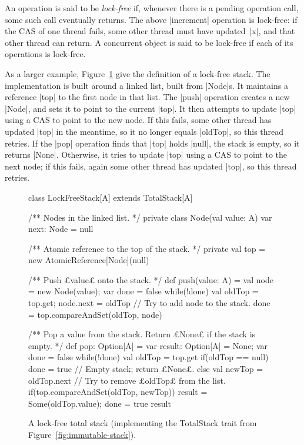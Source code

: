 An operation is said to be \emph{lock-free} if, whenever
there is a pending operation call, some such call eventually returns.  The
above |increment| operation is lock-free: if the CAS of one thread fails, some
other thread must have updated~|x|, and that other thread can return.  A
concurrent object is said to be lock-free if each of its operations is
lock-free.



As a larger example, Figure~\ref{fig:lock-free-stack} give the definition of a
lock-free stack.  The implementation is built around a linked list, built from
|Node|s.  It maintains a reference |top| to the first node in that list.  The
|push| operation creates a new |Node|, and sets it to point to the current
|top|.  It then attempts to update |top| using a CAS to point to the new node.
If this fails, some other thread has updated |top| in the meantime, so it no
longer equals |oldTop|, so this thread retries.  If the |pop| operation finds
that |top| holds |null|, the stack is empty, so it returns |None|.  Otherwise,
it tries to update |top| using a CAS to point to the next node; if this fails,
again some other thread has updated |top|, so this thread retries.


\begin{figure}
\begin{scala}
class LockFreeStack[A] extends TotalStack[A]{
  /** Nodes in the linked list. */
  private class Node(val value: A){
    var next: Node = null
  }

  /** Atomic reference to the top of the stack. */
  private val top = new AtomicReference[Node](null)

  /** Push £value£ onto the stack. */
  def push(value: A) = {
    val node = new Node(value); var done = false
    while(!done){
      val oldTop = top.get; node.next = oldTop
      // Try to add node to the stack.
      done = top.compareAndSet(oldTop, node) 
    } 
  }

  /** Pop a value from the stack. Return £None£ if the stack is empty.  */ 
  def pop: Option[A] = {
    var result: Option[A] = None; var done = false
    while(!done){
      val oldTop = top.get
      if(oldTop == null) done = true // Empty stack; return £None£.
      else{
        val newTop = oldTop.next
        // Try to remove £oldTop£ from the list.
        if(top.compareAndSet(oldTop, newTop)){
          result = Some(oldTop.value); done = true
        }
      }
    }
    result
  }
}
\end{scala}
\caption{A lock-free total stack (implementing the {\scalastyle TotalStack}
  trait from Figure~\protect\ref{fig:immutable-stack}).}
\label{fig:lock-free-stack}
\end{figure}


